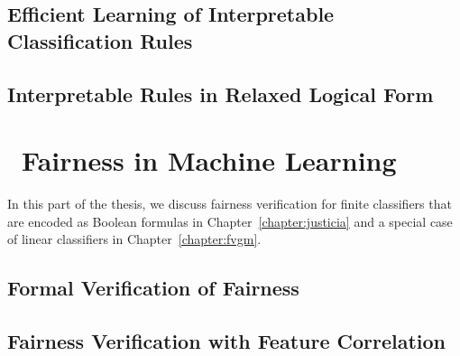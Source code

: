 \chapter{Efficient Learning of Interpretable Classification Rules}










\chapter{Interpretable Rules in Relaxed Logical Form}








\part{~Fairness in Machine Learning}

In this part of the thesis, we discuss fairness verification for finite classifiers that are encoded as Boolean formulas in Chapter~\ref{chapter:justicia} and a special case of linear classifiers in Chapter~\ref{chapter:fvgm}.

\chapter{Formal Verification of Fairness}






\chapter{Fairness Verification with Feature Correlation}






				





